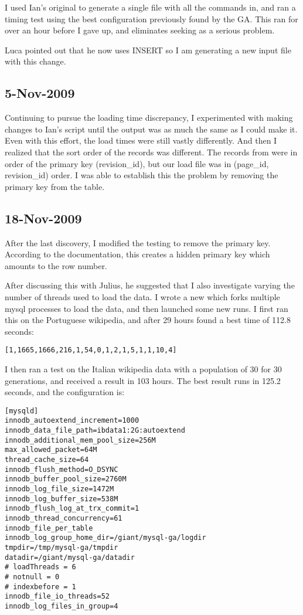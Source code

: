 I used Ian's original  to generate a single file with all the commands in,
and ran a timing test using the best configuration previously found by the GA.
This ran for over an hour before I gave up, and eliminates seeking as a serious problem.

Luca pointed out that he now uses INSERT so I am generating a new input file with this change.

\subsection{5-Nov-2009}

Continuing to pursue the loading time discrepancy, I experimented with making changes to Ian's
 script until the output was as much the same as I could make it.
Even with this effort, the load times were still vastly differently.
And then I realized that the sort order of the records was different.
The records from  were in order of the primary key (revision\_id),
but our load file was in (page\_id, revision\_id) order.
I was able to establish this the problem by removing the primary key from the table.

\subsection{18-Nov-2009}

After the last discovery, I modified the testing to remove the primary key.
According to the \mysql documentation, this creates a hidden primary key which
amounts to the row number.

After discussing this with Julius, he suggested that I also investigate varying
the number of threads used to load the data.
I wrote a new  which forks multiple mysql processes to
load the data, and then launched some new runs.
I first ran this on the Portuguese wikipedia, and after 29 hours found a best time of
112.8 seconds:
\begin{verbatim}
[1,1665,1666,216,1,54,0,1,2,1,5,1,1,10,4]
\end{verbatim}

I then ran a test on the Italian wikipedia data with a population of 30 for 30 generations,
and received a result in 103 hours.
The best result runs in 125.2 seconds, and the configuration is:
\begin{verbatim}
[mysqld]
innodb_autoextend_increment=1000
innodb_data_file_path=ibdata1:2G:autoextend
innodb_additional_mem_pool_size=256M
max_allowed_packet=64M
thread_cache_size=64
innodb_flush_method=O_DSYNC
innodb_buffer_pool_size=2760M
innodb_log_file_size=1472M
innodb_log_buffer_size=538M
innodb_flush_log_at_trx_commit=1
innodb_thread_concurrency=61
innodb_file_per_table
innodb_log_group_home_dir=/giant/mysql-ga/logdir
tmpdir=/tmp/mysql-ga/tmpdir
datadir=/giant/mysql-ga/datadir
# loadThreads = 6
# notnull = 0
# indexbefore = 1
innodb_file_io_threads=52
innodb_log_files_in_group=4
\end{verbatim}

